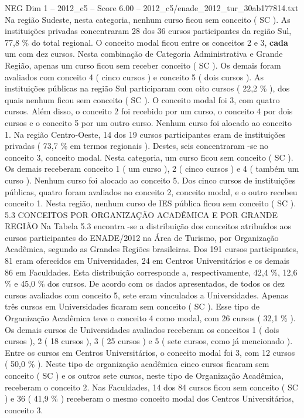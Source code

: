 \begin{textsample}{NEG Dim 1 – 2012\_c5 – Score 6.00 – 2012\_c5/enade\_2012\_tur\_30ab177814.txt}
Na região Sudeste, nesta categoria, nenhum curso ficou sem conceito ( SC ).
As instituições privadas concentraram 28 dos 36 cursos participantes da região Sul, 77,8 \% do total regional.
O conceito modal ficou entre os conceitos 2 e 3, \textbf{cada} um com dez cursos.
Nesta combinação de Categoria Administrativa e Grande Região, apenas um curso ficou sem receber conceito ( SC ).
Os demais foram avaliados com conceito 4 ( cinco cursos ) e conceito 5 ( dois cursos ).
As instituições públicas na região Sul participaram com oito cursos ( 22,2 \% ), dos quais nenhum ficou sem conceito ( SC ).
O conceito modal foi 3, com quatro cursos.
Além disso, o conceito 2 foi recebido por um curso, o conceito 4 por dois cursos e o conceito 5 por um outro curso.
Nenhum curso foi alocado ao conceito 1.
Na região Centro-Oeste, 14 dos 19 cursos participantes eram de instituições privadas ( 73,7 \% em termos regionais ).
Destes, seis concentraram -se no conceito 3, conceito modal.
Nesta categoria, um curso ficou sem conceito ( SC ).
Os demais receberam conceito 1 ( um curso ), 2 ( cinco cursos ) e 4 ( também um curso ).
Nenhum curso foi alocado ao conceito 5.
Dos cinco cursos de instituições públicas, quatro foram avaliados no conceito 2, conceito modal, e o outro recebeu conceito 1.
Nesta região, nenhum curso de IES pública ficou sem conceito ( SC ). 5.3 CONCEITOS POR ORGANIZAÇÃO ACADÊMICA E POR GRANDE REGIÃO Na Tabela 5.3 encontra -se a distribuição dos conceitos atribuídos aos cursos participantes do ENADE/2012 na Área de Turismo, por Organização Acadêmica, segundo as Grandes Regiões brasileiras.
Dos 191 cursos participantes, 81 eram oferecidos em Universidades, 24 em Centros Universitários e os demais 86 em Faculdades.
Esta distribuição corresponde a, respectivamente, 42,4 \%, 12,6 \% e 45,0 \% dos cursos.
De acordo com os dados apresentados, de todos os dez cursos avaliados com conceito 5, sete eram vinculados a Universidades.
Apenas três cursos em Universidades ficaram sem conceito ( SC ).
Esse tipo de Organização Acadêmica teve o conceito 4 como modal, com 26 cursos ( 32,1 \% ).
Os demais cursos de Universidades avaliados receberam os conceitos 1 ( dois cursos ), 2 ( 18 cursos ), 3 ( 25 cursos ) e 5 ( sete cursos, como já mencionado ).
Entre os cursos em Centros Universitários, o conceito modal foi 3, com 12 cursos ( 50,0 \% ).
Neste tipo de organização acadêmica cinco cursos ficaram sem conceito ( SC ) e os outros sete cursos, neste tipo de Organização Acadêmica, receberam o conceito 2.
Nas Faculdades, 14 dos 84 cursos ficou sem conceito ( SC ) e 36 ( 41,9 \% ) receberam o mesmo conceito modal dos Centros Universitários, conceito 3.

\end{textsample}
